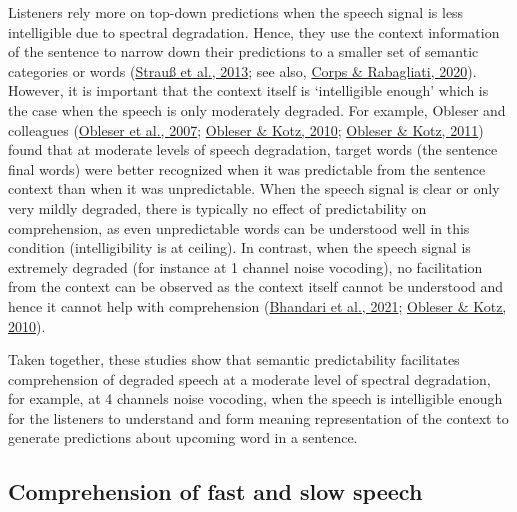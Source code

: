 \documentclass[a4paper, nobind]{templates/ociamthesis}
\begin{document}
Listeners rely more on top-down predictions when the speech signal is less intelligible due to spectral degradation.
Hence, they use the context information of the sentence to narrow down their predictions to a smaller set of semantic categories or words (\protect\hyperlink{ref-Strauss2013}{Strauß et al., 2013}; see also, \protect\hyperlink{ref-Corps2020}{Corps \& Rabagliati, 2020}).
However, it is important that the context itself is `intelligible enough' which is the case when the speech is only moderately degraded.
For example, Obleser and colleagues (\protect\hyperlink{ref-Obleser2007}{Obleser et al., 2007}; \protect\hyperlink{ref-Obleser2010}{Obleser \& Kotz, 2010}; \protect\hyperlink{ref-Obleser2011}{Obleser \& Kotz, 2011}) found that at moderate levels of speech degradation, target words (the sentence final words) were better recognized when it was predictable from the sentence context than when it was unpredictable.
When the speech signal is clear or only very mildly degraded, there is typically no effect of predictability on comprehension, as even unpredictable words can be understood well in this condition (intelligibility is at ceiling).
In contrast, when the speech signal is extremely degraded (for instance at 1 channel noise vocoding), no facilitation from the context can be observed as the context itself cannot be understood and hence it cannot help with comprehension (\protect\hyperlink{ref-Bhandari2021}{Bhandari et al., 2021}; \protect\hyperlink{ref-Obleser2010}{Obleser \& Kotz, 2010}).

Taken together, these studies show that semantic predictability facilitates comprehension of degraded speech at a moderate level of spectral degradation,
for example, at 4 channels noise vocoding,
when the speech is intelligible enough for the listeners to understand and form meaning representation of the context to generate predictions about upcoming word in a sentence.

\hypertarget{comprehension-of-fast-and-slow-speech}{%
\subsection{Comprehension of fast and slow speech}\label{comprehension-of-fast-and-slow-speech}}
\end{document}

